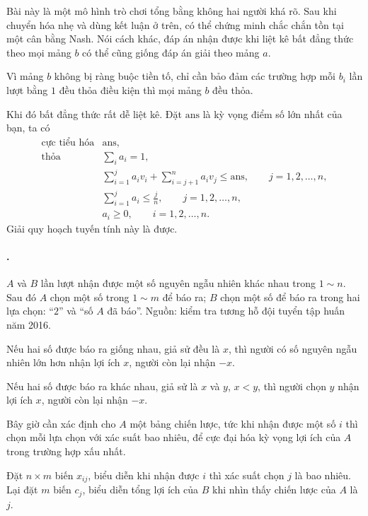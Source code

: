 \documentclass[11pt]{article}
\begin{document}
Bài này là một mô hình trò chơi tổng bằng không hai người khá rõ. Sau khi
chuyển hóa nhẹ và dùng kết luận ở trên, có thể chứng minh chắc chắn tồn tại
một cân bằng Nash. Nói cách khác, đáp án nhận được khi liệt kê bất đẳng thức
theo mọi mảng \(b\) có thể cũng giống đáp án giải theo mảng \(a\).

Vì mảng \(b\) không bị ràng buộc tiền tố, chỉ cần bảo đảm các trường hợp mỗi
\(b_i\) lần lượt bằng \(1\) đều thỏa điều kiện thì mọi mảng \(b\) đều thỏa.

Khi đó bất đẳng thức rất dễ liệt kê. Đặt \(\mathrm{ans}\) là kỳ vọng điểm số
lớn nhất của bạn, ta có
\[
\begin{array}{ll}
\text{cực tiểu hóa} & \mathrm{ans},\\[0.3em]
\text{thỏa} & \displaystyle \sum_i a_i=1,\\[0.4em]
& \displaystyle \sum_{i=1}^{j}a_iv_i+
  \sum_{i=j+1}^{n}a_iv_j\le \mathrm{ans},
  \qquad j=1,2,\ldots,n,\\[0.7em]
& \displaystyle \sum_{i=1}^{j}a_i\le \frac{j}{n},
  \qquad j=1,2,\ldots,n,\\[0.7em]
& a_i\ge 0,\qquad i=1,2,\ldots,n.
\end{array}
\]
Giải quy hoạch tuyến tính này là được.

\paragraph{.}
\(A\) và \(B\) lần lượt nhận được một số nguyên ngẫu nhiên khác nhau trong
\(1\sim n\). Sau đó \(A\) chọn một số trong \(1\sim m\) để báo ra; \(B\) chọn
một số để báo ra trong hai lựa chọn: ``\(2\)'' và ``số \(A\) đã báo''. Nguồn:
kiểm tra tương hỗ đội tuyển tập huấn năm 2016.

Nếu hai số được báo ra giống nhau, giả sử đều là \(x\), thì người có số
nguyên ngẫu nhiên lớn hơn nhận lợi ích \(x\), người còn lại nhận \(-x\).

Nếu hai số được báo ra khác nhau, giả sử là \(x\) và \(y\), \(x<y\), thì người
chọn \(y\) nhận lợi ích \(x\), người còn lại nhận \(-x\).

Bây giờ cần xác định cho \(A\) một bảng chiến lược, tức khi nhận được một số
\(i\) thì chọn mỗi lựa chọn với xác suất bao nhiêu, để cực đại hóa kỳ vọng lợi
ích của \(A\) trong trường hợp xấu nhất.

Đặt \(n\times m\) biến \(x_{ij}\), biểu diễn khi nhận được \(i\) thì xác suất
chọn \(j\) là bao nhiêu. Lại đặt \(m\) biến \(c_j\), biểu diễn tổng lợi ích
của \(B\) khi nhìn thấy chiến lược của \(A\) là \(j\).
\end{document}
